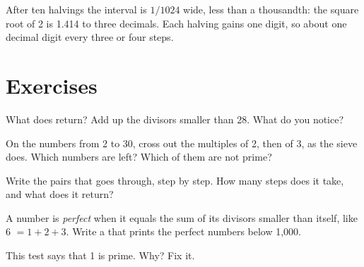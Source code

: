 \label{lst:g9:algorithms-on-numbers:sqrt}

\label{out:g9:algorithms-on-numbers:sqrt}

After ten halvings the interval is $1 / 1024$ wide, less than a thousandth: the
square root of 2 is 1.414 to three decimals. Each halving gains one 
digit, so about one decimal digit every three or four steps.

\section{Exercises}

\begin{exercise}[$\star$]\label{exo:g9:algorithms-on-numbers:1}
What does  return? Add up the divisors smaller than 28. What
do you notice?
\end{exercise}

\begin{exercise}[$\star$]\label{exo:g9:algorithms-on-numbers:2}
On the numbers from 2 to 30, cross out the multiples of 2, then of 3, as the
sieve does. Which numbers are left? Which of them are not prime?
\end{exercise}

\begin{exercise}[$\star$]\label{exo:g9:algorithms-on-numbers:3}
Write the pairs that  goes through, step by step. How many
steps does it take, and what does it return?
\end{exercise}

\begin{exercise}[$\star$]\label{exo:g9:algorithms-on-numbers:4}
A number is \emph{perfect} when it equals the sum of its divisors smaller than
itself, like 6 $= 1 + 2 + 3$. Write a  that prints the perfect numbers
below 1,000.
\end{exercise}

\begin{exercise}[$\star\star$]\label{exo:g9:algorithms-on-numbers:5}
This test says that 1 is prime. Why? Fix it.

\label{lst:g9:algorithms-on-numbers:one-bug}
\end{exercise}


